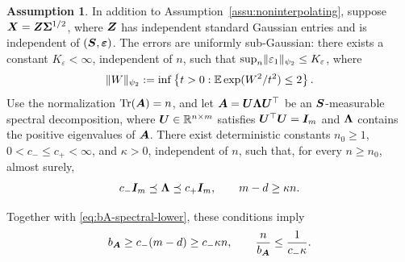 \documentclass{article}
\theoremstyle{plain} %
\theoremstyle{definition} %
\newtheorem{assumption}[theorem]{Assumption}
\theoremstyle{definition} %
\begin{document}
\begin{assumption}
\label{assu:Gaussian-Stein-design}
In addition to Assumption~\ref{assu:noninterpolating}, suppose
$\boldsymbol{X}=\boldsymbol{Z}\boldsymbol{\Sigma}^{1/2}$, where $\boldsymbol{Z}$ has independent standard Gaussian
entries and is independent of $(\boldsymbol{S},{\boldsymbol{\varepsilon} })$.
The errors are uniformly sub-Gaussian: there exists a constant
$K_\varepsilon<\infty$, independent of $n$, such that
$\sup_n\lVert\varepsilon_1\rVert_{\psi_2}\leq K_\varepsilon$, where
\begin{align*}
    \lVert W\rVert_{\psi_2}
    :=\inf\left\{t>0:{\mathbb{E}}\exp(W^2/t^2)\leq2\right\}.
\end{align*}
Use the normalization $\operatorname{Tr}(\boldsymbol{A})=n$, and let
$\boldsymbol{A}=\boldsymbol{U}\boldsymbol{\Lambda}\boldsymbol{U}^\top$ be an $\boldsymbol{S}$-measurable spectral
decomposition, where $\boldsymbol{U}\in{\mathbb{R}}^{n\times m}$ satisfies
$\boldsymbol{U}^\top\boldsymbol{U}=\boldsymbol{I}_m$ and $\boldsymbol{\Lambda}$ contains the positive eigenvalues
of $\boldsymbol{A}$. There exist deterministic constants $n_0\geq1$,
$0<c_-\leq c_+<\infty$, and $\kappa>0$, independent of $n$, such
that, for every $n\geq n_0$, almost surely,
\begin{align}
    c_-\boldsymbol{I}_m\preceq\boldsymbol{\Lambda}\preceq c_+\boldsymbol{I}_m,
    \qquad
    m-d\geq\kappa n.
    \label{eq:balanced-sketch-conditions}
\end{align}
\end{assumption}
Together with \eqref{eq:bA-spectral-lower}, these conditions imply
\begin{align*}
    b_{\boldsymbol{A}}\geq c_-(m-d)\geq c_-\kappa n,
    \qquad \frac{n}{b_{\boldsymbol{A}}}\leq\frac{1}{c_-\kappa}.
\end{align*}
\end{document}
